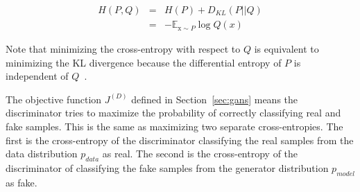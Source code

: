 \documentclass[twocolumn]{article}
\numberwithin{equation}{section}
\begin{document}
\begin{eqnarray}
    H(P,Q) &=& H(P) + D_{KL}(P||Q) \nonumber \\
           &=& -\mathbb{E}_{\text{x}\sim P} \log Q(x)
\end{eqnarray}

Note that minimizing the cross-entropy with respect to $Q$ is equivalent to minimizing the KL divergence because the differential entropy of $P$ is independent of $Q$~\cite{gf_book}. 

The objective function $J^{(D)}$ defined in Section~\ref{sec:gans} means the discriminator tries to maximize the probability of correctly classifying real and fake samples. This is the same as maximizing two separate cross-entropies. The first is the cross-entropy of the discriminator classifying the real samples from the data distribution $p_{data}$ as real. The second is the cross-entropy of the discriminator of classifying the fake samples from the generator distribution $p_{model}$ as fake. 




\end{document}
